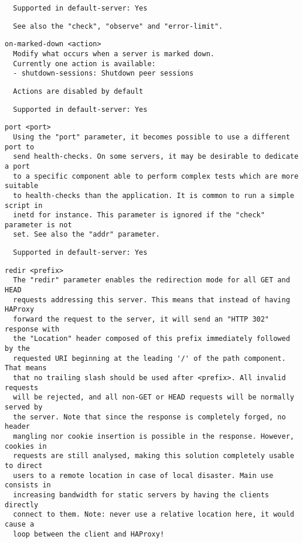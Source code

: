 \begin{verbatim}
  Supported in default-server: Yes
\end{verbatim}

\begin{verbatim}
  See also the "check", "observe" and "error-limit".
\end{verbatim}

\begin{verbatim}
on-marked-down <action>
  Modify what occurs when a server is marked down.
  Currently one action is available:
  - shutdown-sessions: Shutdown peer sessions
\end{verbatim}

\begin{verbatim}
  Actions are disabled by default
\end{verbatim}

\begin{verbatim}
  Supported in default-server: Yes
\end{verbatim}

\begin{verbatim}
port <port>
  Using the "port" parameter, it becomes possible to use a different port to
  send health-checks. On some servers, it may be desirable to dedicate a port
  to a specific component able to perform complex tests which are more suitable
  to health-checks than the application. It is common to run a simple script in
  inetd for instance. This parameter is ignored if the "check" parameter is not
  set. See also the "addr" parameter.
\end{verbatim}

\begin{verbatim}
  Supported in default-server: Yes
\end{verbatim}

\begin{verbatim}
redir <prefix>
  The "redir" parameter enables the redirection mode for all GET and HEAD
  requests addressing this server. This means that instead of having HAProxy
  forward the request to the server, it will send an "HTTP 302" response with
  the "Location" header composed of this prefix immediately followed by the
  requested URI beginning at the leading '/' of the path component. That means
  that no trailing slash should be used after <prefix>. All invalid requests
  will be rejected, and all non-GET or HEAD requests will be normally served by
  the server. Note that since the response is completely forged, no header
  mangling nor cookie insertion is possible in the response. However, cookies in
  requests are still analysed, making this solution completely usable to direct
  users to a remote location in case of local disaster. Main use consists in
  increasing bandwidth for static servers by having the clients directly
  connect to them. Note: never use a relative location here, it would cause a
  loop between the client and HAProxy!
\end{verbatim}

